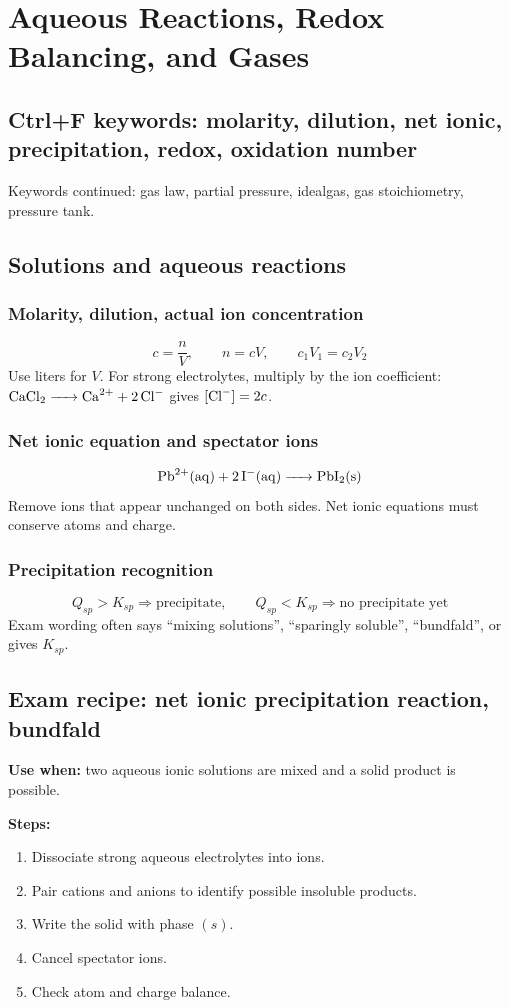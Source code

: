\section{Aqueous Reactions, Redox Balancing, and Gases}

\subsection{Ctrl+F keywords: molarity, dilution, net ionic, precipitation, redox, oxidation number}
Keywords continued: gas law, partial pressure, idealgas, gas stoichiometry, pressure tank.

\subsection{Solutions and aqueous reactions}

\subsubsection{Molarity, dilution, actual ion concentration}
\[
c=\frac{n}{V}, \qquad n=cV, \qquad c_1V_1=c_2V_2
\]
Use liters for \(V\). For strong electrolytes, multiply by the ion coefficient: \(\ce{CaCl2 -> Ca^2+ + 2Cl-}\) gives \([\ce{Cl-}]=2c\).

\subsubsection{Net ionic equation and spectator ions}
\[
\ce{Pb^2+(aq) + 2I-(aq) -> PbI2(s)}
\]
Remove ions that appear unchanged on both sides. Net ionic equations must conserve atoms and charge.

\subsubsection{Precipitation recognition}
\[
Q_{sp}>K_{sp}\Rightarrow\text{precipitate}, \qquad Q_{sp}<K_{sp}\Rightarrow\text{no precipitate yet}
\]
Exam wording often says ``mixing solutions'', ``sparingly soluble'', ``bundfald'', or gives \(K_{sp}\).

\subsection{Exam recipe: net ionic precipitation reaction, bundfald}
\textbf{Use when:} two aqueous ionic solutions are mixed and a solid product is possible.

\textbf{Steps:}
\begin{enumerate}
    \item Dissociate strong aqueous electrolytes into ions.
    \item Pair cations and anions to identify possible insoluble products.
    \item Write the solid with phase \((s)\).
    \item Cancel spectator ions.
    \item Check atom and charge balance.
\end{enumerate}


